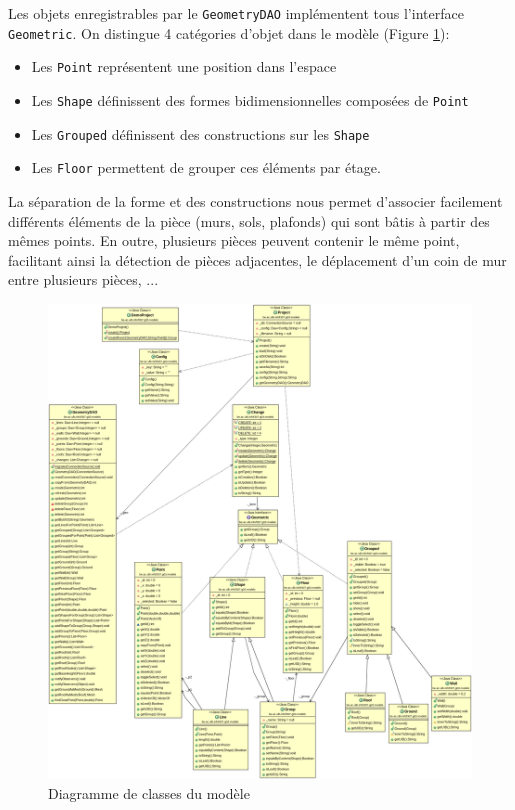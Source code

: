 	Les objets enregistrables par le \texttt{GeometryDAO} implémentent tous
	l'interface \texttt{Geometric}. On distingue 4 catégories d'objet dans le
	modèle (Figure \ref{fig:models:classdiagram}):

	\begin{itemize}
		\item Les \texttt{Point} représentent une position dans l'espace
		\item Les \texttt{Shape} définissent des formes bidimensionnelles 
		      composées de \texttt{Point}
		\item Les \texttt{Grouped} définissent des constructions sur les 
		      \texttt{Shape}
		\item Les \texttt{Floor} permettent de grouper ces éléments par étage.
	\end{itemize}

	La séparation de la forme et des constructions nous permet d'associer
	facilement différents éléments de la pièce (murs, sols, plafonds) qui sont
	bâtis à partir des mêmes points. En outre, plusieurs pièces peuvent contenir
	le même point, facilitant ainsi la détection de pièces adjacentes, le
	déplacement d'un coin de mur entre plusieurs pièces, ...

	\begin{figure}[h!]
		\includegraphics[width=\textwidth]{uml/models.png}
		\caption{\label{fig:models:classdiagram} Diagramme de classes du modèle}
	\end{figure}

